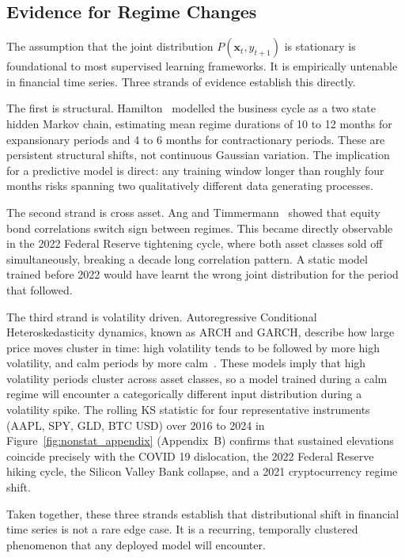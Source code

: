 \subsection{Evidence for Regime Changes}

The assumption that the joint distribution $P(\mathbf{x}_t, y_{t+1})$ is stationary is foundational to most supervised learning frameworks. It is empirically untenable in financial time series. Three strands of evidence establish this directly.

The first is structural. Hamilton~\cite{hamilton1989} modelled the business cycle as a two state hidden Markov chain, estimating mean regime durations of 10 to 12 months for expansionary periods and 4 to 6 months for contractionary periods. These are persistent structural shifts, not continuous Gaussian variation. The implication for a predictive model is direct: any training window longer than roughly four months risks spanning two qualitatively different data generating processes.

The second strand is cross asset. Ang and Timmermann~\cite{ang2012regime} showed that equity bond correlations switch sign between regimes. This became directly observable in the 2022 Federal Reserve tightening cycle, where both asset classes sold off simultaneously, breaking a decade long correlation pattern. A static model trained before 2022 would have learnt the wrong joint distribution for the period that followed.

The third strand is volatility driven. Autoregressive Conditional Heteroskedasticity dynamics, known as ARCH and GARCH, describe how large price moves cluster in time: high volatility tends to be followed by more high volatility, and calm periods by more calm~\cite{engle1982,bollerslev1986}. These models imply that high volatility periods cluster across asset classes, so a model trained during a calm regime will encounter a categorically different input distribution during a volatility spike. The rolling KS statistic for four representative instruments (AAPL, SPY, GLD, BTC USD) over 2016 to 2024 in Figure~\ref{fig:nonstat_appendix} (Appendix~B) confirms that sustained elevations coincide precisely with the COVID 19 dislocation, the 2022 Federal Reserve hiking cycle, the Silicon Valley Bank collapse, and a 2021 cryptocurrency regime shift.

Taken together, these three strands establish that distributional shift in financial time series is not a rare edge case. It is a recurring, temporally clustered phenomenon that any deployed model will encounter.


